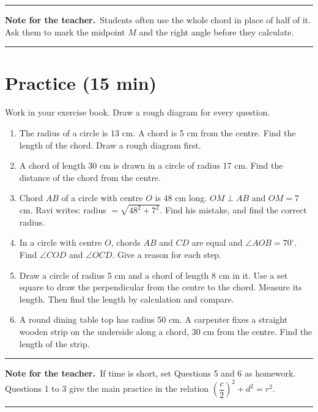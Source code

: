 \documentclass[11pt,a4paper]{article}
\theoremstyle{brand}
\theoremstyle{branddef}
\newenvironment{exercise}[1]
  {\par\medskip\Needspace{7\baselineskip}\noindent{\large\bfseries\color{accent}Exercise #1}
   \par\smallskip
   \begin{enumerate}[leftmargin=*,itemsep=4pt]}
  {\end{enumerate}}
\newcommand{\facilitatornote}[1]{%
  \par\medskip\noindent
  \colorbox{panel}{%
    \parbox{\dimexpr\linewidth-2\fboxsep\relax}{%
      \smallskip
      {\small\textbf{Note for the teacher.}\ #1}
      \smallskip}}
  \par\medskip}
\newcommand{\facilitatornote}[1]{}
\renewcommand{\colorbox}[2]{\par\smallskip\noindent\textcolor{black!35}{\rule{\linewidth}{0.4pt}}\par\nointerlineskip\vspace{3pt}\noindent#2\par\vspace{2pt}\noindent\textcolor{black!35}{\rule{\linewidth}{0.4pt}}\par\smallskip}
\begin{document}
\facilitatornote{Students often use the whole chord in place of half of it. Ask them to mark the midpoint $M$ and the right angle before they calculate.}
\section{Practice \normalfont\small(15 min)}

Work in your exercise book. Draw a rough diagram for every question.

\begin{exercise}{1A}
\item The radius of a circle is 13 cm. A chord is 5 cm from the centre. Find the length of the chord. Draw a rough diagram first.
\item A chord of length 30 cm is drawn in a circle of radius 17 cm. Find the distance of the chord from the centre.
\item Chord $AB$ of a circle with centre $O$ is 48 cm long. $OM \perp AB$ and $OM = 7$ cm. Ravi writes: radius $=\sqrt{48^2+7^2}$. Find his mistake, and find the correct radius.
\item In a circle with centre $O$, chords $AB$ and $CD$ are equal and $\angle AOB = 70^\circ$. Find $\angle COD$ and $\angle OCD$. Give a reason for each step.
\item Draw a circle of radius 5 cm and a chord of length 8 cm in it. Use a set square to draw the perpendicular from the centre to the chord. Measure its length. Then find the length by calculation and compare.
\item A round dining table top has radius 50 cm. A carpenter fixes a straight wooden strip on the underside along a chord, 30 cm from the centre. Find the length of the strip.
\end{exercise}

\facilitatornote{If time is short, set Questions 5 and 6 as homework. Questions 1 to 3 give the main practice in the relation $\left(\dfrac{c}{2}\right)^2 + d^2 = r^2$.}
\end{document}
